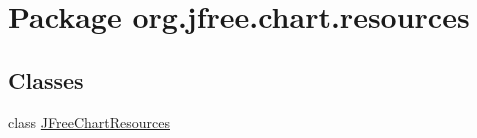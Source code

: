 \hypertarget{namespaceorg_1_1jfree_1_1chart_1_1resources}{}\section{Package org.\+jfree.\+chart.\+resources}
\label{namespaceorg_1_1jfree_1_1chart_1_1resources}
\subsection*{Classes}
\begin{DoxyCompactItemize}
\item 
class \mbox{\hyperlink{classorg_1_1jfree_1_1chart_1_1resources_1_1_j_free_chart_resources}{J\+Free\+Chart\+Resources}}
\end{DoxyCompactItemize}
